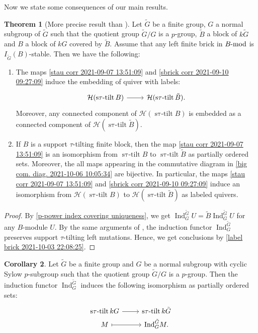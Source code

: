 \documentclass[pdftex,a4paper]{article}
\numberwithin{equation}{subsection}
\theoremstyle{definition}
\newtheorem{theorem}{Theorem}[section]
\newtheorem{corollary}[theorem]{Corollary}
\newcommand{\lmod}{\operatorname{\mathrm{\hspace{-2pt}-mod}}}
\newcommand{\induc}{{\operatorname{Ind}\nolimits}}
\newcommand{\stautilt}{\operatorname{\mathrm{s\tau-tilt}}}
\newcommand{\inertiagp}{I}
\begin{document}
Now we state some consequences of our main results.
\begin{theorem}[{More precise result than \cite[Theorem 4.2]{MR4243358}}]\label{p-extension 2021-10-06 10:06:35}
	Let \(\tilde{G}\) be a finite group, \(G\) a normal subgroup of \(\tilde{G}\) such that the quotient group \(\tilde{G}/G\) is a \(p\)-group, \(\tilde{B}\) a block of \(k\tilde{G}\) and \(B\) a block of \(kG\) covered by \(\tilde{B}\).
	Assume that any left finite brick in \(B\lmod\) is \(\inertiagp_{\tilde{G}}(B)\)-stable.
	Then we have the following:
	\begin{enumerate}
		\item The maps \eqref{stau corr 2021-09-07 13:51:09} and \eqref{sbrick corr 2021-09-10 09:27:09} induce the embedding of quiver with labels:
		      \begin{equation}
			      \begin{tikzcd}
				      \mathcal{H}(\stautilt B)\ar[r]& \mathcal{H}(\stautilt \tilde{B}).
			      \end{tikzcd}
		      \end{equation}
		      Moreover, any connected component of \(\mathcal{H}(\stautilt B)\) is embedded as a connected component of \(\mathcal{H}(\stautilt \tilde{B})\).
		\item If \(B\) is a support \(\tau\)-tilting finite block, then the map \eqref{stau corr 2021-09-07 13:51:09} is an isomorphism from \(\stautilt B\) to \(\stautilt \tilde{B}\) as partially ordered sets. Moreover, the all maps appearing in the commutative diagram in \cref{big com. diag. 2021-10-06 10:05:34} are bijective. In particular, the maps \eqref{stau corr 2021-09-07 13:51:09} and \eqref{sbrick corr 2021-09-10 09:27:09} induce an isomorphism from \(\mathcal{H}(\stautilt B)\) to \(\mathcal{H}(\stautilt \tilde{B})\) as labeled quivers.
	\end{enumerate}
\end{theorem}
\begin{proof}
	By \cref{p-power index covering uniqueness}, we get \(\induc_G^{\tilde{G}} U=\tilde{B}\induc_G^{\tilde{G}} U\) for any \(B\)-module \(U\).
	By the same arguments of \cite[Theorem 4.2]{MR4243358},
	the induction functor \(\induc_G^{\tilde{G}}\) preserves support \(\tau\)-tilting left mutations.
	Hence, we get conclusions by \cref{label brick 2021-10-03 22:08:25}.
\end{proof}
\begin{corollary}
	Let \(\tilde{G}\) be a finite group and \(G\) be a normal subgroup with cyclic Sylow \(p\)-subgroup such that the quotient group \(\tilde{G}/G\) is a \(p\)-group.
	Then the induction functor \(\induc_G^{\tilde{G}}\) induces the following isomorphism as partially ordered sets:
	\begin{equation}\label{kg stau 2021-10-08 14:56:34}
		\begin{tikzcd}[row sep=1pt]
			\stautilt kG\ar[r]& \stautilt k\tilde{G}\\M \ar[r,mapsto] &\induc_G^{\tilde{G}} M.
		\end{tikzcd}
	\end{equation}
\end{corollary}
\end{document}
